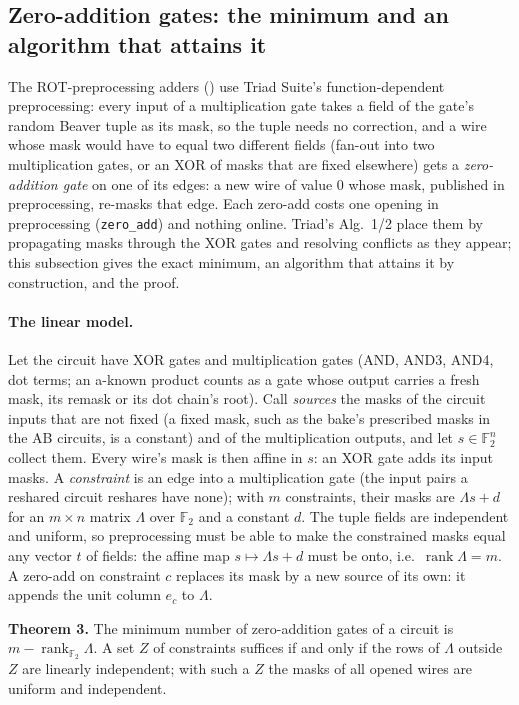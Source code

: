 \subsection{Zero-addition gates: the minimum and an algorithm that attains it}\label{sec:zeroadd}

The ROT-preprocessing adders () use Triad Suite's function-dependent preprocessing: every
input of a multiplication gate takes a field of the gate's random Beaver tuple as its mask, so the tuple needs no
correction, and a wire whose mask would have to equal two different fields (fan-out into two multiplication gates, or
an XOR of masks that are fixed elsewhere) gets a \emph{zero-addition gate} on one of its edges: a new wire of value 0
whose mask, published in preprocessing, re-masks that edge. Each zero-add costs one opening in preprocessing
(\texttt{zero\_add}) and nothing online. Triad's Alg.~1/2 place them by propagating masks through the XOR gates and
resolving conflicts as they appear; this subsection gives the exact minimum, an algorithm that attains it by
construction, and the proof.

\paragraph{The linear model.} Let the circuit have XOR gates and multiplication gates (AND, AND3, AND4, dot terms; an
a-known product counts as a gate whose output carries a fresh mask, its remask or its dot chain's root). Call
\emph{sources} the masks of the circuit inputs that are not fixed (a fixed mask, such as the bake's prescribed masks
in the AB circuits, is a constant) and of the multiplication outputs, and let $s \in \mathbb{F}_2^n$ collect them.
Every wire's mask is then affine in $s$: an XOR gate adds its input masks. A \emph{constraint} is an edge into a
multiplication gate (the input pairs a reshared circuit reshares have none); with $m$ constraints, their masks are
$\Lambda s + d$ for an $m \times n$ matrix $\Lambda$ over $\mathbb{F}_2$ and a constant $d$. The tuple fields are
independent and uniform, so preprocessing must be able to make the constrained masks equal any vector $t$ of fields:
the affine map $s \mapsto \Lambda s + d$ must be onto, i.e.\ $\operatorname{rank}\Lambda = m$. A zero-add on
constraint $c$ replaces its mask by a new source of its own: it appends the unit column $e_c$ to $\Lambda$.

\textbf{Theorem 3.} The minimum number of zero-addition gates of a circuit is $m - \operatorname{rank}_{\mathbb{F}_2}\Lambda$.
A set $Z$ of constraints suffices if and only if the rows of $\Lambda$ outside $Z$ are linearly independent; with
such a $Z$ the masks of all opened wires are uniform and independent.

